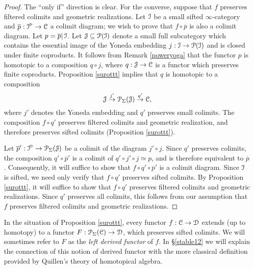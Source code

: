 \begin{proof}
The ``only if'' direction is clear. For the converse, suppose that $f$ preserves filtered colimits and geometric realizations. Let $\operatorname{\mathcal{I}}$ be a small sifted $\infty$-category and $\overline{p}: \operatorname{\mathcal{I}}^{\triangleright} \rightarrow \operatorname{\mathcal{C}}$ a colimit diagram; we wish to prove that $f \circ \overline{p}$ is also a colimit diagram. Let $p = \overline{p} | \operatorname{\mathcal{I}}$. Let $\operatorname{\mathcal{J}} \subseteq \operatorname{\mathcal{P}}(\operatorname{\mathcal{I}})$ denote a small full subcategory which contains the essential image of the Yoneda embedding $j: \operatorname{\mathcal{I}} \rightarrow \operatorname{\mathcal{P}}(\operatorname{\mathcal{I}})$ and is closed under finite coproducts. It follows from Remark \ref{poweryoga} that
the functor $p$ is homotopic to a composition $q \circ j$, where $q: \operatorname{\mathcal{J}} \rightarrow \operatorname{\mathcal{C}}$ is a functor which preserves finite coproducts. Proposition \ref{surottt} implies that
$q$ is homotopic to a composition
$$ \operatorname{\mathcal{J}} \stackrel{j'}{\rightarrow} \operatorname{\mathcal{P}}_{\Sigma}(\operatorname{\mathcal{J}}) \stackrel{q'}{\rightarrow} \operatorname{\mathcal{C}},$$
where $j'$ denotes the Yoneda embedding and $q'$ preserves small colimits. 
The composition $f \circ q'$ preserves filtered colimits and geometric realization, and therefore
preserves sifted colimits (Proposition \ref{surottt}). 

Let $\overline{p}': \operatorname{\mathcal{I}}^{\triangleright} \rightarrow \operatorname{\mathcal{P}}_{\Sigma}(\operatorname{\mathcal{J}})$ be a colimit of the diagram
$j' \circ j$. Since $q'$ preserves colimits, the composition $q' \circ \overline{p}'$ is a colimit of
$q' \circ j' \circ j \simeq p$, and is therefore equivalent to $\overline{p}$. Consequently, it will suffice to show that $f \circ q' \circ \overline{p}'$ is a colimit diagram. Since $\operatorname{\mathcal{I}}$ is sifted, we need only
verify that $f \circ q'$ preserves sifted colimits. By Proposition \ref{surottt}, it will suffice to show that
$f \circ q'$ preserves filtered colimits and geometric realizations. Since $q'$ preserves all colimits, this follows from our assumption that $f$ preserves filtered colimits and geometric realizations.
\end{proof}

In the situation of Proposition \ref{surottt}, every functor $f: \operatorname{\mathcal{C}} \rightarrow \operatorname{\mathcal{D}}$ extends (up to homotopy) to a functor $F: \operatorname{\mathcal{P}}_{\Sigma}(\operatorname{\mathcal{C}}) \rightarrow \operatorname{\mathcal{D}}$, which preserves sifted colimits. We will sometimes refer to $F$ as the {\it left derived functor} of $f$. In \S \ref{stable12} we will explain the connection of this notion of derived functor with the more classical definition provided by Quillen's theory of homotopical algebra.

